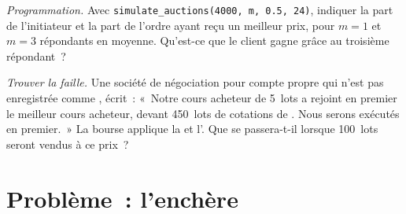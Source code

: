 \begin{exercise}[$\star\star\star$]\label{exo:m1:options-market-structure:7}
\emph{Programmation.} Avec \texttt{simulate\_auctions(4000, m, 0.5, 24)}, indiquer la part de l'initiateur et la
part de l'ordre ayant reçu un meilleur prix, pour $m = 1$ et $m = 3$ répondants en
moyenne. Qu'est-ce que le client gagne grâce au troisième
répondant~?
\end{exercise}

\begin{exercise}[$\star\star\star$]\label{exo:m1:options-market-structure:8}
\emph{Trouver la faille.} Une société de négociation pour compte propre qui n'est pas enregistrée comme
, écrit~: «~Notre cours acheteur de 5~lots a rejoint en premier le meilleur cours
acheteur, devant 450~lots de cotations de . Nous serons exécutés en premier.~» La bourse
applique la  et l'. Que se passera-t-il lorsque 100~lots seront
vendus à ce prix~?
\end{exercise}

\section{Problème~: l'enchère}

